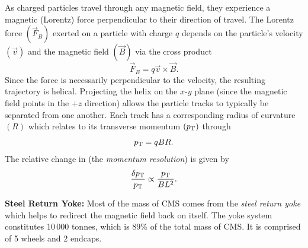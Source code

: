 As charged particles travel through any magnetic field, they experience a magnetic (Lorentz) force perpendicular to their direction of travel.
The Lorentz force $\left( \vec{F}_B \right)$ exerted on a particle with charge $q$ depends on the particle's velocity $\left( \vec{v} \right)$ and the magnetic field $\left( \vec{B} \right)$ via the cross product
\begin{equation*}
    \vec{F}_B = q \vec{v} \times \vec{B}.
\end{equation*}
Since the force is necessarily perpendicular to the velocity, the resulting trajectory is helical.
Projecting the helix on the $x$-$y$ plane (since the magnetic field points in the $+z$ direction) allows the particle tracks to typically be separated from one another.
Each track has a corresponding radius of curvature $\left( R \right)$ which relates to its transverse momentum $\left( p_{\mathrm{T}} \right)$ through
\begin{equation*}
    p_{\mathrm{T}} = qBR.
\end{equation*}
The relative change in \pt (\ie the \emph{momentum resolution}) is given by
\begin{equation}
    \frac{\delta p_{\mathrm{T}}}{p_{\mathrm{T}}} \propto \frac{p_{\mathrm{T}}}{BL^2}.
\end{equation}

\textbf{Steel Return Yoke:} 
Most of the mass of CMS comes from the \emph{steel return yoke} which helps to redirect the magnetic field back on itself. 
The yoke system constitutes 10\,000 tonnes, which is 89\% of the total mass of CMS.
It is comprised of 5 wheels and 2 endcaps.
